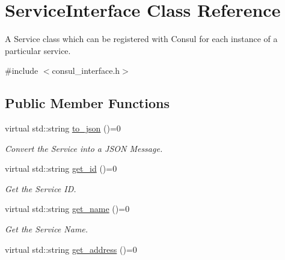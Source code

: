 \hypertarget{classServiceInterface}{\section{Service\-Interface Class Reference}
\label{classServiceInterface}
}


A Service class which can be registered with Consul for each instance of a particular service.  




{\ttfamily \#include $<$consul\-\_\-interface.\-h$>$}

\subsection*{Public Member Functions}
\begin{DoxyCompactItemize}
\item 
virtual std\-::string \hyperlink{classServiceInterface_a2c041d65d3e725f1cf8e2379f4620d58}{to\-\_\-json} ()=0
\begin{DoxyCompactList}\small\item\em Convert the Service into a J\-S\-O\-N Message. \end{DoxyCompactList}\item 
\hypertarget{classServiceInterface_a0ba731e4d379cbeddc852304b470c617}{virtual std\-::string \hyperlink{classServiceInterface_a0ba731e4d379cbeddc852304b470c617}{get\-\_\-id} ()=0}\label{classServiceInterface_a0ba731e4d379cbeddc852304b470c617}

\begin{DoxyCompactList}\small\item\em Get the Service I\-D. \end{DoxyCompactList}\item 
\hypertarget{classServiceInterface_aed2140959e23f98cd0cca1a101646384}{virtual std\-::string \hyperlink{classServiceInterface_aed2140959e23f98cd0cca1a101646384}{get\-\_\-name} ()=0}\label{classServiceInterface_aed2140959e23f98cd0cca1a101646384}

\begin{DoxyCompactList}\small\item\em Get the Service Name. \end{DoxyCompactList}\item 
\hypertarget{classServiceInterface_a6c4fd6eff9e1c8eed5dfed301d2f8047}{virtual std\-::string \hyperlink{classServiceInterface_a6c4fd6eff9e1c8eed5dfed301d2f8047}{get\-\_\-address} ()=0}\label{classServiceInterface_a6c4fd6eff9e1c8eed5dfed301d2f8047}


\end{DoxyCompactItemize}
